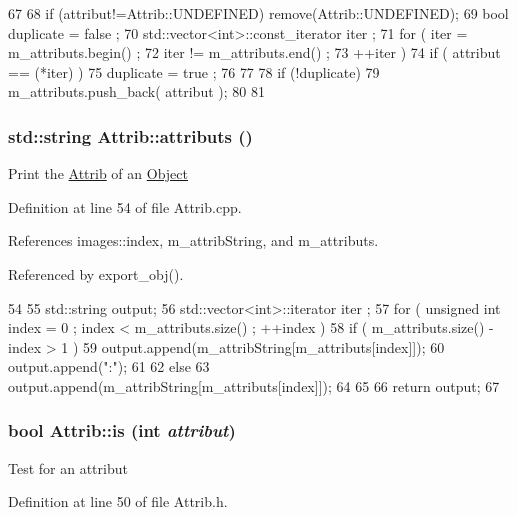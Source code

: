\begin{DoxyCode}
67                             {
68     if (attribut!=Attrib::UNDEFINED) remove(Attrib::UNDEFINED);
69     bool duplicate = false ;
70     std::vector<int>::const_iterator iter ;
71     for ( iter  = m_attributs.begin() ;
72           iter != m_attributs.end()   ;
73           ++iter ) {
74       if ( attribut == (*iter) ) {
75         duplicate = true ;
76       }
77     }
78     if (!duplicate) {
79       m_attributs.push_back( attribut );
80     }
81   }
\end{DoxyCode}
\hypertarget{classAttrib_aee7bbf16b144887f196e1341b24f8a26}{
\subsubsection[{attributs}]{\setlength{\rightskip}{0pt plus 5cm}std::string Attrib::attributs ()}}
\label{classAttrib_aee7bbf16b144887f196e1341b24f8a26}
Print the \hyperlink{classAttrib}{Attrib} of an \hyperlink{classObject}{Object} 

Definition at line 54 of file Attrib.cpp.

References images::index, m\_\-attribString, and m\_\-attributs.

Referenced by export\_\-obj().


\begin{DoxyCode}
54                             {
55   std::string output;
56   std::vector<int>::iterator iter ;
57   for ( unsigned int index = 0 ; index < m_attributs.size() ; ++index ) {
58     if ( m_attributs.size() - index > 1 ) {
59       output.append(m_attribString[m_attributs[index]]);
60       output.append(":");
61     }
62     else {
63       output.append(m_attribString[m_attributs[index]]);
64     }
65   }
66   return output;
67 }
\end{DoxyCode}
\hypertarget{classAttrib_a704f26af560909ad22065083bb7d4c34}{
\subsubsection[{is}]{\setlength{\rightskip}{0pt plus 5cm}bool Attrib::is (int {\em attribut})}}
\label{classAttrib_a704f26af560909ad22065083bb7d4c34}
Test for an attribut 

Definition at line 50 of file Attrib.h.

